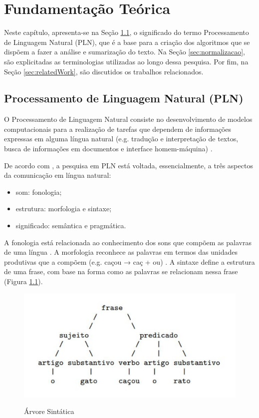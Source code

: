\chapter{Fundamentação Teórica}
\label{cap:fundamentacao-teorica}

Neste capítulo, apresenta-se na Seção \ref{sec:levantamento-bibliografico}, o significado do termo Processamento de 
Linguagem Natural (PLN), que é a base para a criação dos algoritmos que se dispõem a fazer a análise e sumarização do texto. Na Seção \ref{sec:normalizacao}, são explicitadas as terminologias utilizadas ao longo dessa pesquisa. Por fim, na Seção \ref{sec:relatedWork}, são discutidos os trabalhos relacionados.

\section{Processamento de Linguagem Natural (PLN)}
\label{sec:levantamento-bibliografico}
O Processamento de Linguagem Natural consiste no desenvolvimento de modelos computacionais para a realização de tarefas que dependem de informações expressas em alguma língua natural (e.g. tradução e interpretação de textos, busca de informações em documentos e interface homem-máquina) \cite{moro2018reconhecimento, do2019processamento}.

De acordo com , a pesquisa em PLN está voltada, essencialmente, a três aspectos da comunicação em língua natural:
\begin{itemize}
	\item som: fonologia;
	\item estrutura: morfologia e sintaxe;
	\item significado: semântica e pragmática.
\end{itemize}

A fonologia está relacionada ao conhecimento dos sons que compõem as palavras de uma língua \cite{sousa2022praticas}. A morfologia reconhece as palavras em termos das unidades produtivas que a compõem (e.g. caçou → caç + ou) \cite{lacotizflexao}. A sintaxe define a estrutura de uma frase, com base na forma como as palavras se relacionam nessa frase (Figura \ref{fig:sintaxe}).

\begin{figure}[h]
    \centering
        \caption{Árvore Sintática}
    \includegraphics{figuras/figura-1_arvore.png}
    \label{fig:sintaxe}
\end{figure}

